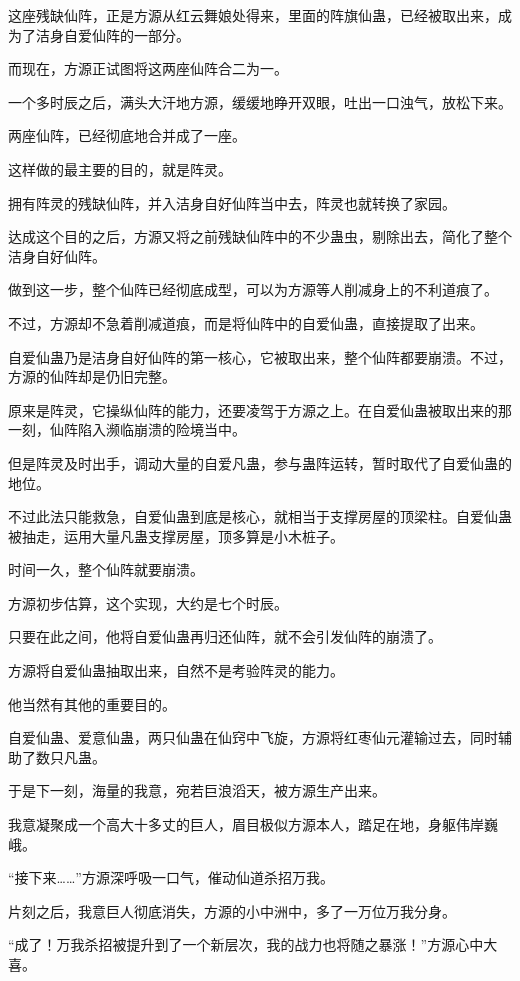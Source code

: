 \begin{this_body}
这座残缺仙阵，正是方源从红云舞娘处得来，里面的阵旗仙蛊，已经被取出来，成为了洁身自爱仙阵的一部分。

而现在，方源正试图将这两座仙阵合二为一。

一个多时辰之后，满头大汗地方源，缓缓地睁开双眼，吐出一口浊气，放松下来。

两座仙阵，已经彻底地合并成了一座。

这样做的最主要的目的，就是阵灵。

拥有阵灵的残缺仙阵，并入洁身自好仙阵当中去，阵灵也就转换了家园。

达成这个目的之后，方源又将之前残缺仙阵中的不少蛊虫，剔除出去，简化了整个洁身自好仙阵。

做到这一步，整个仙阵已经彻底成型，可以为方源等人削减身上的不利道痕了。

不过，方源却不急着削减道痕，而是将仙阵中的自爱仙蛊，直接提取了出来。

自爱仙蛊乃是洁身自好仙阵的第一核心，它被取出来，整个仙阵都要崩溃。不过，方源的仙阵却是仍旧完整。

原来是阵灵，它操纵仙阵的能力，还要凌驾于方源之上。在自爱仙蛊被取出来的那一刻，仙阵陷入濒临崩溃的险境当中。

但是阵灵及时出手，调动大量的自爱凡蛊，参与蛊阵运转，暂时取代了自爱仙蛊的地位。

不过此法只能救急，自爱仙蛊到底是核心，就相当于支撑房屋的顶梁柱。自爱仙蛊被抽走，运用大量凡蛊支撑房屋，顶多算是小木桩子。

时间一久，整个仙阵就要崩溃。

方源初步估算，这个实现，大约是七个时辰。

只要在此之间，他将自爱仙蛊再归还仙阵，就不会引发仙阵的崩溃了。

方源将自爱仙蛊抽取出来，自然不是考验阵灵的能力。

他当然有其他的重要目的。

自爱仙蛊、爱意仙蛊，两只仙蛊在仙窍中飞旋，方源将红枣仙元灌输过去，同时辅助了数只凡蛊。

于是下一刻，海量的我意，宛若巨浪滔天，被方源生产出来。

我意凝聚成一个高大十多丈的巨人，眉目极似方源本人，踏足在地，身躯伟岸巍峨。

“接下来……”方源深呼吸一口气，催动仙道杀招万我。

片刻之后，我意巨人彻底消失，方源的小中洲中，多了一万位万我分身。

“成了！万我杀招被提升到了一个新层次，我的战力也将随之暴涨！”方源心中大喜。

\end{this_body}


